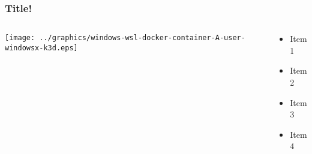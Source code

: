     \begin{frame}
      \frametitle{Title!}
      \begin{columns}
        \begin{column}{0.5\textwidth}
          \texttt{[image: ../graphics/windows-wsl-docker-container-A-user-windowsx-k3d.eps]}
        \end{column}
        \begin{column}{0.5\textwidth}
          \begin{itemize}
          \item Item 1
          \item Item 2
          \item Item 3
          \item Item 4
          \end{itemize}
        \end{column}
      \end{columns}
    \end{frame}


